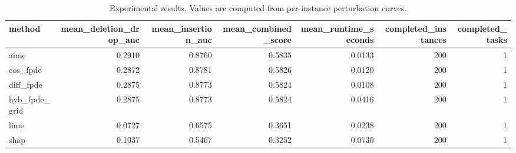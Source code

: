 \begin{table}[t]
\caption{Experimental results. Values are computed from per-instance perturbation curves.}
\label{tab:main_results_computed}
\centering
\begin{tabular}{lrrrrrr}
\toprule
method & mean\_deletion\_drop\_auc & mean\_insertion\_auc & mean\_combined\_score & mean\_runtime\_seconds & completed\_instances & completed\_tasks \\
\midrule
aime & 0.2910 & 0.8760 & 0.5835 & 0.0133 & 200 & 1 \\
cos\_fpde & 0.2872 & 0.8781 & 0.5826 & 0.0120 & 200 & 1 \\
diff\_fpde & 0.2875 & 0.8773 & 0.5824 & 0.0108 & 200 & 1 \\
hyb\_fpde\_grid & 0.2875 & 0.8773 & 0.5824 & 0.0416 & 200 & 1 \\
lime & 0.0727 & 0.6575 & 0.3651 & 0.0238 & 200 & 1 \\
shap & 0.1037 & 0.5467 & 0.3252 & 0.0730 & 200 & 1 \\
\bottomrule
\end{tabular}

\end{table}
